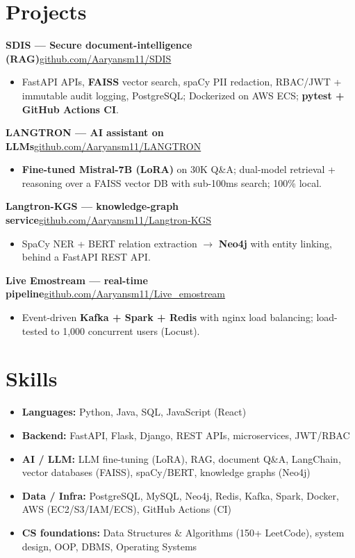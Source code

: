 \documentclass[10pt,a4paper]{article}
\begin{document}
\section*{Projects}
\vspace{1pt}\textbf{SDIS --- Secure document-intelligence (RAG)}\hfill {\small\href{https://github.com/Aaryansm11/SDIS}{github.com/Aaryansm11/SDIS}}
\begin{itemize}
\item FastAPI APIs, \textbf{FAISS} vector search, spaCy PII redaction, RBAC/JWT + immutable audit logging, PostgreSQL; Dockerized on AWS ECS; \textbf{pytest + GitHub Actions CI}.
\end{itemize}
\vspace{1pt}\textbf{LANGTRON --- AI assistant on LLMs}\hfill {\small\href{https://github.com/Aaryansm11/LANGTRON}{github.com/Aaryansm11/LANGTRON}}
\begin{itemize}
\item \textbf{Fine-tuned Mistral-7B (LoRA)} on 30K Q\&A; dual-model retrieval + reasoning over a FAISS vector DB with sub-100ms search; 100\% local.
\end{itemize}
\vspace{1pt}\textbf{Langtron-KGS --- knowledge-graph service}\hfill {\small\href{https://github.com/Aaryansm11/Langtron-KGS}{github.com/Aaryansm11/Langtron-KGS}}
\begin{itemize}
\item SpaCy NER + BERT relation extraction $\rightarrow$ \textbf{Neo4j} with entity linking, behind a FastAPI REST API.
\end{itemize}
\vspace{1pt}\textbf{Live Emostream --- real-time pipeline}\hfill {\small\href{https://github.com/Aaryansm11/Live_emostream}{github.com/Aaryansm11/Live\_emostream}}
\begin{itemize}
\item Event-driven \textbf{Kafka + Spark + Redis} with nginx load balancing; load-tested to 1,000 concurrent users (Locust).
\end{itemize}
\section*{Skills}
\begin{itemize}
\item \textbf{Languages:} Python, Java, SQL, JavaScript (React)
\item \textbf{Backend:} FastAPI, Flask, Django, REST APIs, microservices, JWT/RBAC
\item \textbf{AI / LLM:} LLM fine-tuning (LoRA), RAG, document Q\&A, LangChain, vector databases (FAISS), spaCy/BERT, knowledge graphs (Neo4j)
\item \textbf{Data / Infra:} PostgreSQL, MySQL, Neo4j, Redis, Kafka, Spark, Docker, AWS (EC2/S3/IAM/ECS), GitHub Actions (CI)
\item \textbf{CS foundations:} Data Structures \& Algorithms (150+ LeetCode), system design, OOP, DBMS, Operating Systems
\end{itemize}
\end{document}
